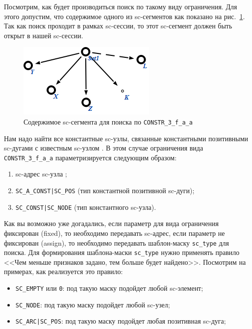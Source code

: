 Посмотрим, как будет производиться поиск по такому виду
ограничения. Для этого допустим, что содержимое одного из sc-сегментов
как показано на рис.~\ref{fig:Data_for_CONSTR_3_f_a_a}. Так как поиск
проходит в рамках sc-сессии, то этот sc-сегмент должен быть открыт в
нашей sc-сессии.

\begin{figure}[h!]
  \centering
  \includegraphics{images/4/search/Data_for_CONSTR_3_f_a_a}
  \caption{Содержимое sc-сегмента для поиска по \lstinline|CONSTR_3_f_a_a|}
  \label{fig:Data_for_CONSTR_3_f_a_a}
\end{figure}

Нам надо найти все константные sc-узлы, связанные константными
позитивными sc-дугами с известным sc-узлом . В этом случае
ограничения вида \lstinline|CONSTR_3_f_a_a| параметризируется
следующим образом:
\begin{enumerate}
\item sc-адрес sc-узла ;
\item \lstinline+SC_A_CONST|SC_POS+ (тип константной позитивной sc-дуги);
\item \lstinline+SC_CONST|SC_NODE+ (тип константного sc-узла).
\end{enumerate}

Как вы возможно уже догадались, если параметр для вида ограничения
фиксирован (fixed), то необходимо передавать sc-адрес, если параметр
не фиксирован (assign), то необходимо передавать шаблон-маску
\lstinline|sc_type| для поиска. Для формирования шаблона-маски
\lstinline|sc_type| нужно применять правило <<Чем меньше признаков
задано, тем больше будет найдено>>. Посмотрим на примерах, как
реализуется это правило:
\begin{itemize}
\item \lstinline|SC_EMPTY| или \lstinline|0|: под такую маску подойдет
  любой sc-элемент;
\item \lstinline|SC_NODE|: под такую маску подойдет любой sc-узел;
\item \lstinline+SC_ARC|SC_POS+: под такую маску подойдет любая
  позитивная sc-дуга;
\end{itemize}


